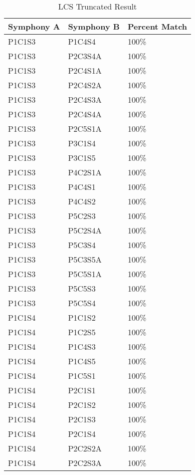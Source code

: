 \begin{longtable}{|l|l|l|}
\caption{LCS Truncated Result}
\label{my-label}\\
\hline
Symphony A & Symphony B & Percent Match \\ \hline
\endfirsthead
%
\endhead
%
P1C1S3 & P1C4S4 & 100\% \\ \hline
P1C1S3 & P2C3S4A & 100\% \\ \hline
P1C1S3 & P2C4S1A & 100\% \\ \hline
P1C1S3 & P2C4S2A & 100\% \\ \hline
P1C1S3 & P2C4S3A & 100\% \\ \hline
P1C1S3 & P2C4S4A & 100\% \\ \hline
P1C1S3 & P2C5S1A & 100\% \\ \hline
P1C1S3 & P3C1S4 & 100\% \\ \hline
P1C1S3 & P3C1S5 & 100\% \\ \hline
P1C1S3 & P4C2S1A & 100\% \\ \hline
P1C1S3 & P4C4S1 & 100\% \\ \hline
P1C1S3 & P4C4S2 & 100\% \\ \hline
P1C1S3 & P5C2S3 & 100\% \\ \hline
P1C1S3 & P5C2S4A & 100\% \\ \hline
P1C1S3 & P5C3S4 & 100\% \\ \hline
P1C1S3 & P5C3S5A & 100\% \\ \hline
P1C1S3 & P5C5S1A & 100\% \\ \hline
P1C1S3 & P5C5S3 & 100\% \\ \hline
P1C1S3 & P5C5S4 & 100\% \\ \hline
P1C1S4 & P1C1S2 & 100\% \\ \hline
P1C1S4 & P1C2S5 & 100\% \\ \hline
P1C1S4 & P1C4S3 & 100\% \\ \hline
P1C1S4 & P1C4S5 & 100\% \\ \hline
P1C1S4 & P1C5S1 & 100\% \\ \hline
P1C1S4 & P2C1S1 & 100\% \\ \hline
P1C1S4 & P2C1S2 & 100\% \\ \hline
P1C1S4 & P2C1S3 & 100\% \\ \hline
P1C1S4 & P2C1S4 & 100\% \\ \hline
P1C1S4 & P2C2S2A & 100\% \\ \hline
P1C1S4 & P2C2S3A & 100\% \\ \hline
\end{longtable}

